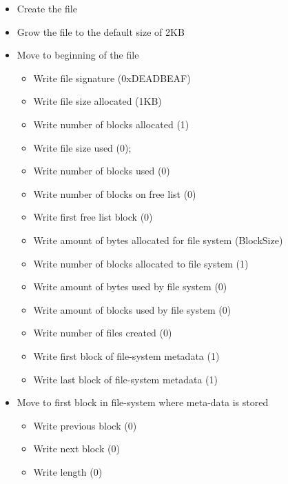 \documentclass{article}
\begin{document}
\begin{itemize}
    \item   Create the file
    \item   Grow the file to the default size of 2KB
        \item    Move to beginning of the file
        \begin{itemize}
            \item   Write file signature (0xDEADBEAF)
            \item   Write file size allocated (1KB)
            \item   Write number of blocks allocated (1)
            \item   Write file size used (0);
            \item   Write number of blocks used (0)
            \item   Write number of blocks on free list (0)
            \item   Write first free list block (0)
            \item   Write amount of bytes allocated for file system (BlockSize) 
            \item   Write number of blocks allocated to file system (1)
            \item   Write amount of bytes used by file system (0)
            \item   Write amount of blocks used by file system (0)
            \item   Write number of files created (0)
            \item   Write first block of file-system metadata (1) 
            \item   Write last block of file-system metadata (1) 
        \end{itemize}
    \item   Move to first block in file-system where meta-data is stored
        \begin{itemize}
            \item   Write previous block (0)
            \item   Write next block (0)
            \item   Write length (0)
        \end{itemize}
\end{itemize}
\end{document}
